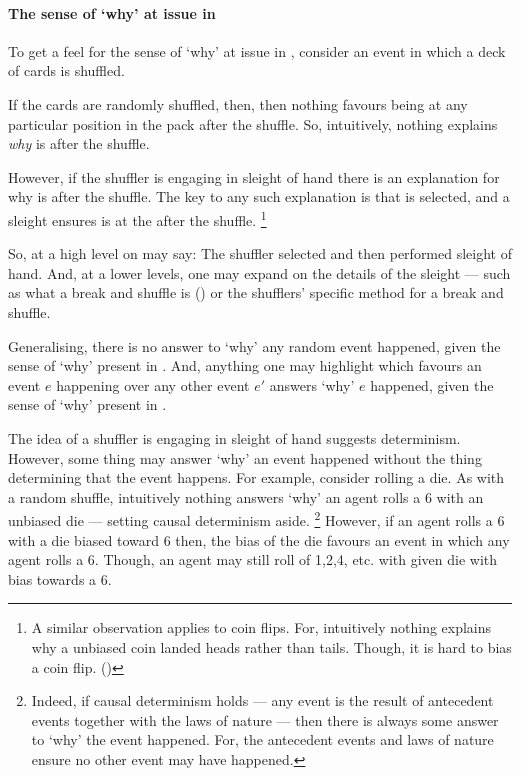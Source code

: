 \paragraph*{The sense of `why' at issue in \qWhy{}}


\begin{note}
  To get a feel for the sense of `why' at issue in \qWhy{}, consider an event in which a deck of cards is shuffled.

  If the cards are randomly shuffled, then, then nothing favours \mainCard{} being at any particular position in the pack after the shuffle.
  So, intuitively, nothing explains \emph{why} \mainCard{} is \mainCardPos{} after the shuffle.

  However, if the shuffler is engaging in sleight of hand there is an explanation for why \mainCard{} is \mainCardPos{} after the shuffle.
  The key to any such explanation is that \mainCard{} is selected, and a sleight ensures \mainCard{} is at the \mainCardPos{} after the shuffle.%
  \footnote{
    A similar observation applies to coin flips.
    For, intuitively nothing explains why a unbiased coin landed heads rather than tails.
    Though, it is hard to bias a coin flip. (\cite{Gelman:2002ww})
  }

  So, at a high level on may say: The shuffler selected \mainCard{} and then performed sleight of hand.
  And, at a lower levels, one may expand on the details of the sleight --- such as what a break and shuffle is (\cite[cf.][189--190]{Hilliard:1994aa}) or the shufflers' specific method for a break and shuffle.
\end{note}


\begin{note}%
  \nocite{Hoefer:2023aa}%
  Generalising, there is no answer to `why' any random event happened, given the sense of `why' present in \qWhy{}.
  And, anything one may highlight which favours an event \(e\) happening over any other event \(e'\) answers `why' \(e\) happened, given the sense of `why' present in \qWhy{}.
\end{note}


\begin{note}
  The idea of a shuffler is engaging in sleight of hand suggests determinism.
  However, some thing may answer `why' an event happened without the thing determining that the event happens.
  For example, consider rolling a die.
  As with a random shuffle, intuitively nothing answers `why' an agent rolls a 6 with an unbiased die --- setting causal determinism aside.%
  \footnote{
    Indeed, if causal determinism holds --- any event is the result of antecedent events together with the laws of nature --- then there is always some answer to `why' the event happened.
    For, the antecedent events and laws of nature ensure no other event may have happened.
  }
  However, if an agent rolls a 6 with a die biased toward 6 then, the bias of the die favours an event in which any agent rolls a 6.
  Though, an agent may still roll of 1,2,4, etc. with given die with bias towards a 6.
\end{note}



